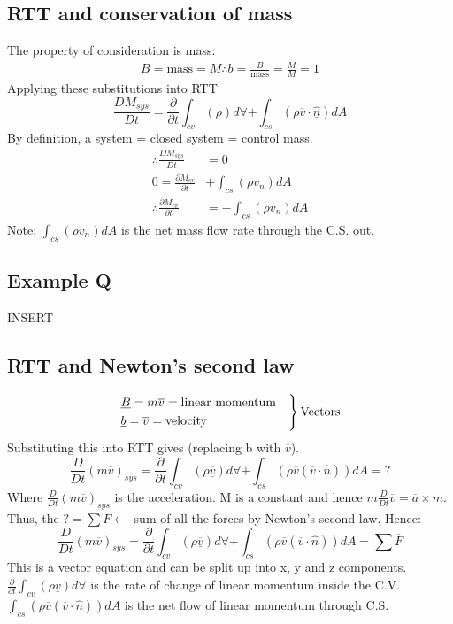 \documentclass[class=report, crop=false, 12pt,a4paper]{standalone}
\begin{document}
\subsection{RTT and conservation of mass}
The property of consideration is mass: 
\begin{gather}
  B = \textrm{mass} = M
  \therefore b = \frac{B}{\textrm{mass}} = \frac{M}{M} = 1
\end{gather}
Applying these substitutions into RTT
\begin{equation}
  \frac{DM_{sys}}{Dt} = \frac{\partial}{\partial t} \int_{cv} (\rho)d\forall + \int_{cs} (\rho \overline{v} \cdot \underline{\hat{n}}) dA
\end{equation}
By definition, a system = closed system = control mass.
\begin{align}
  \therefore \frac{DM_{sys}}{Dt} &= 0\\
  0 =\frac{\partial M_{cv}}{\partial t} &+ \int_{cs} (\rho v_n) dA\\
  \therefore \frac{\partial M_{cv}}{\partial t} &= - \int_{cs} (\rho v_n) dA
\end{align}
Note: $\int_{cs} (\rho v_n) dA$ is the net mass flow rate through the C.S. out.
\subsection{Example Q}
INSERT
\subsection{RTT and Newton's second law}
\begin{equation}
  \begin{rcases}
    \underline{B} = m \overline{v} = \textrm{linear momentum}&\\
    \underline{b} = \overline{v} = \textrm{velocity}&
  \end{rcases} \textrm{Vectors}
\end{equation}
Substituting this into RTT gives (replacing b with $\overline{v}$).
\begin{equation}
  \frac{D}{Dt}(m\overline{v})_{sys} = \frac{\partial}{\partial t} \int_{cv} (\rho \underline{\overline{v}}) d\forall + \int_{cs} (\rho \overline{v} (\overline{v}\cdot \hat{n})) dA = ?
\end{equation}
Where $\frac{D}{Dt}(m\overline{v})_{sys}$ is the acceleration. M is a constant and hence $m\frac{D}{Dt}\overline{v} = \overline{a} \times m$. Thus, the $? = \sum \overline{F} \leftarrow$ sum of all the forces by Newton's second law. Hence:
\begin{equation}
  \frac{D}{Dt} (m \overline{v})_{sys} = \frac{\partial}{\partial t} \int_{cv} (\rho \overline{\underline{v}}) d\forall + \int_{cs} (\rho \overline{v}(\overline{v} \cdot \hat{n})) dA = \sum \overline{F}
\end{equation}
This is a vector equation and can be split up into x, y and z components. $\frac{\partial}{\partial t} \int_{cv} (\rho \overline{\underline{v}}) d\forall$ is the rate of change of linear momentum inside the C.V. $\int_{cs} (\rho \overline{v}(\overline{v} \cdot \hat{n})) dA$ is the net flow of linear momentum through C.S.
\end{document}
